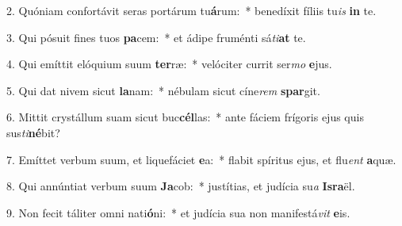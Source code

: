 2. Quóniam confortávit seras portárum tu\textbf{á}rum:~*  benedíxit fíliis tu\textit{is} \textbf{in} te.\

3. Qui pósuit fines tuos \textbf{pa}cem:~*  et ádipe fruménti sá\textit{ti}\textbf{at} te.\

4. Qui emíttit elóquium suum \textbf{ter}ræ:~*  velóciter currit ser\textit{mo} \textbf{e}jus.\

5. Qui dat nivem sicut \textbf{la}nam:~*  nébulam sicut cíne\textit{rem} \textbf{spar}git.\

6. Mittit crystállum suam sicut buc\textbf{cél}las:~*  ante fáciem frígoris ejus quis sus\textit{ti}\textbf{né}bit?\

7. Emíttet verbum suum, et liquefáciet \textbf{e}a:~*  flabit spíritus ejus, et flu\textit{ent} \textbf{a}quæ.\

8. Qui annúntiat verbum suum \textbf{Ja}cob:~*  justítias, et judícia su\textit{a} \textbf{Is}\textbf{ra}ël.\

9. Non fecit táliter omni nati\textbf{ó}ni:~*  et judícia sua non manifestá\textit{vit} \textbf{e}is.\

